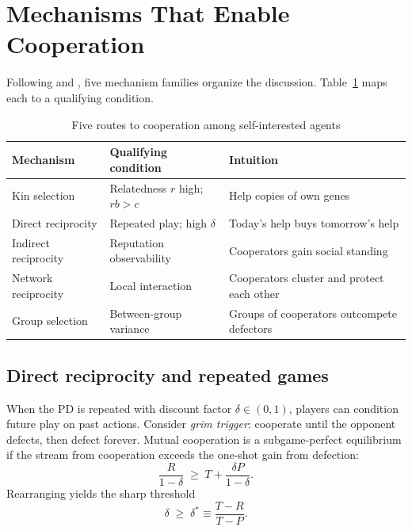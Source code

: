 \documentclass[11pt,a4paper]{article}
\begin{document}
\section{Mechanisms That Enable Cooperation}

Following \citet{nowak2006} and \citet{west2007}, five mechanism families organize the discussion. Table~\ref{tab:mechanisms} maps each to a qualifying condition.

\begin{table}[htbp]
  \centering
  \caption{Five routes to cooperation among self-interested agents \citep{nowak2006}}
  \label{tab:mechanisms}
  \begin{tabular}{@{}lll@{}}
    \toprule
    Mechanism & Qualifying condition & Intuition \\
    \midrule
    Kin selection & Relatedness $r$ high; $rb > c$ & Help copies of own genes \\
    Direct reciprocity & Repeated play; high $\delta$ & Today's help buys tomorrow's help \\
    Indirect reciprocity & Reputation observability & Cooperators gain social standing \\
    Network reciprocity & Local interaction & Cooperators cluster and protect each other \\
    Group selection & Between-group variance & Groups of cooperators outcompete defectors \\
    \bottomrule
  \end{tabular}
\end{table}

\subsection{Direct reciprocity and repeated games}

When the PD is repeated with discount factor $\delta \in (0,1)$, players can condition future play on past actions. Consider \emph{grim trigger}: cooperate until the opponent defects, then defect forever. Mutual cooperation is a subgame-perfect equilibrium if the stream from cooperation exceeds the one-shot gain from defection:
\begin{equation}
  \frac{R}{1-\delta} \;\ge\; T + \frac{\delta P}{1-\delta}.
  \label{eq:grim}
\end{equation}
Rearranging yields the sharp threshold
\begin{equation}
  \delta \;\ge\; \delta^* \equiv \frac{T-R}{T-P}.
  \label{eq:delta-star}
\end{equation}
\end{document}
